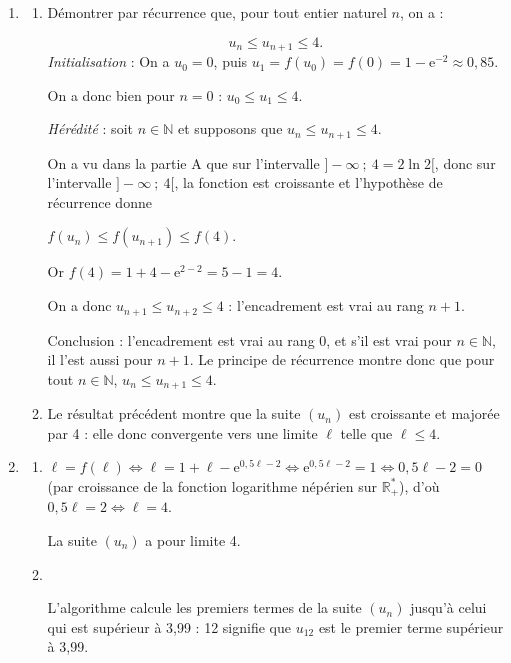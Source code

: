 \documentclass[10pt]{article}
\providecommand{\R}{\mathbb{R}}
\providecommand{\N}{\mathbb{N}}
\begin{document}
\begin{enumerate}
\item 
	\begin{enumerate}
		\item Démontrer par récurrence que, pour tout entier naturel $n$, on a : 

		\[u_n \leqslant u_{n+1} \leqslant 4.\]
\emph{Initialisation } : On a $u_0 = 0$, puis $u_1 = f\left(u_0\right) = f(0) = 1 - \text{e}^{-2} \approx 0,85$.

On a donc bien pour $n= 0$ : $u_0 \leqslant u_1 \leqslant 4$.

\emph{Hérédité} : soit $n \in \N$ et supposons que $u_n \leqslant u_{n+1} \leqslant 4$.

On a vu dans la partie A que sur l'intervalle $]- \infty~;~4 = 2\ln 2[$, donc sur l'intervalle $]- \infty~;~4[$, la fonction est croissante et l'hypothèse de récurrence donne

$f\left(u_n \right) \leqslant f\left(u_{n+1} \right) \leqslant f(4)$.

Or $f(4) = 1 + 4 - \text{e}^{2 - 2} = 5 -1 = 4$.

On a donc $u_{n+1} \leqslant u_{n+2} \leqslant 4$ : l'encadrement est vrai au rang $n + 1$.

Conclusion : l'encadrement est vrai au rang 0, et s'il est vrai pour $n \in \N$, il l'est aussi pour $n + 1$.
Le principe de récurrence montre donc que pour tout $n \in \N$, \: $u_n \leqslant u_{n+1} \leqslant 4$.
		
		\item 

Le résultat précédent montre que la suite $\left(u_n\right)$ est croissante et majorée par 4 : elle donc convergente vers une limite $\ell$ telle que $\ell \leqslant 4$.
	\end{enumerate}	
\item 
	\begin{enumerate}
		\item 
		

$\ell = f(\ell) \iff \ell = 1 + \ell - \text{e}^{0,5\ell - 2} \iff \text{e}^{0,5\ell - 2} = 1 \iff 0,5\ell - 2 = 0$ (par croissance de la fonction logarithme népérien sur $\R_{+}^*$), d'où $0,5\ell = 2 \iff \ell = 4$.

La suite $\left(u_n\right)$ a pour limite 4.
		\item ~
		

















L'algorithme calcule les premiers termes de la suite $\left(u_n\right)$ jusqu'à celui qui est supérieur à 3,99 : 12 signifie que $u_{12}$ est le premier terme supérieur à 3,99.
	\end{enumerate}
\end{enumerate}

\bigskip
\end{document}
